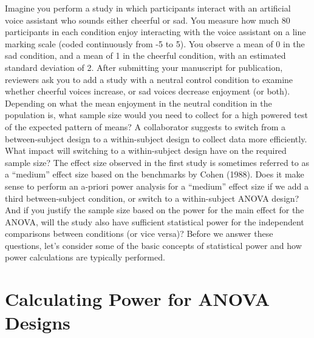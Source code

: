\documentclass[
  english,
  ,jou,floatsintext]{apa6}
\begin{document}
Imagine you perform a study in which participants interact with an artificial voice assistant who sounds either cheerful or sad.
You measure how much 80 participants in each condition enjoy interacting with the voice assistant on a line marking scale (coded continuously from -5 to 5).
You observe a mean of 0 in the sad condition, and a mean of 1 in the cheerful condition, with an estimated standard deviation of 2.
After submitting your manuscript for publication, reviewers ask you to add a study with a neutral control condition to examine whether cheerful voices increase, or sad voices decrease enjoyment (or both).
Depending on what the mean enjoyment in the neutral condition in the population is, what sample size would you need to collect for a high powered test of the expected pattern of means?
A collaborator suggests to switch from a between-subject design to a within-subject design to collect data more efficiently.
What impact will switching to a within-subject design have on the required sample size?
The effect size observed in the first study is sometimes referred to as a \enquote{medium} effect size based on the benchmarks by Cohen (1988).
Does it make sense to perform an a-priori power analysis for a \enquote{medium} effect size if we add a third between-subject condition, or switch to a within-subject ANOVA design?
And if you justify the sample size based on the power for the main effect for the ANOVA, will the study also have sufficient statistical power for the independent comparisons between conditions (or vice versa)?
Before we answer these questions, let's consider some of the basic concepts of statistical power and how power calculations are typically performed.

\hypertarget{calculating-power-for-anova-designs}{%
\section{Calculating Power for ANOVA Designs}\label{calculating-power-for-anova-designs}}
\end{document}
